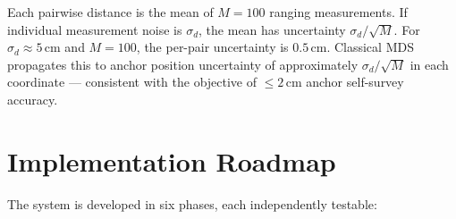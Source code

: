 \documentclass[11pt,a4paper]{article}
\begin{document}
Each pairwise distance is the mean of $M = 100$ ranging measurements. If individual measurement noise is $\sigma_d$, the mean has uncertainty $\sigma_d/\sqrt{M}$. For $\sigma_d \approx 5$\,cm and $M = 100$, the per-pair uncertainty is $0.5$\,cm. Classical MDS propagates this to anchor position uncertainty of approximately $\sigma_d/\sqrt{M}$ in each coordinate — consistent with the objective of $\leq 2$\,cm anchor self-survey accuracy.

\section{Implementation Roadmap}

The system is developed in six phases, each independently testable:
\end{document}
